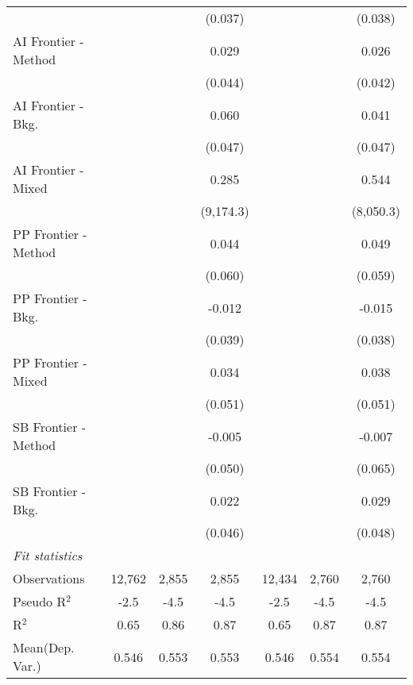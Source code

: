 \begin{tabular}{lcccccc}
                        &                &         & (0.037)   &                &         & (0.038)\\   
   AI Frontier - Method &                &         & 0.029     &                &         & 0.026\\   
                        &                &         & (0.044)   &                &         & (0.042)\\   
   AI Frontier - Bkg.   &                &         & 0.060     &                &         & 0.041\\   
                        &                &         & (0.047)   &                &         & (0.047)\\   
   AI Frontier - Mixed  &                &         & 0.285     &                &         & 0.544\\   
                        &                &         & (9,174.3) &                &         & (8,050.3)\\   
   PP Frontier - Method &                &         & 0.044     &                &         & 0.049\\   
                        &                &         & (0.060)   &                &         & (0.059)\\   
   PP Frontier - Bkg.   &                &         & -0.012    &                &         & -0.015\\   
                        &                &         & (0.039)   &                &         & (0.038)\\   
   PP Frontier - Mixed  &                &         & 0.034     &                &         & 0.038\\   
                        &                &         & (0.051)   &                &         & (0.051)\\   
   SB Frontier - Method &                &         & -0.005    &                &         & -0.007\\   
                        &                &         & (0.050)   &                &         & (0.065)\\   
   SB Frontier - Bkg.   &                &         & 0.022     &                &         & 0.029\\   
                        &                &         & (0.046)   &                &         & (0.048)\\   
   \midrule
   \emph{Fit statistics}\\
   Observations         & 12,762         & 2,855   & 2,855     & 12,434         & 2,760   & 2,760\\  
   Pseudo R$^2$         & -2.5           & -4.5    & -4.5      & -2.5           & -4.5    & -4.5\\  
   R$^2$                & 0.65           & 0.86    & 0.87      & 0.65           & 0.87    & 0.87\\  
Mean(Dep. Var.) & 0.546 & 0.553 & 0.553 & 0.546 & 0.554 & 0.554 \\
   

\end{tabular}
